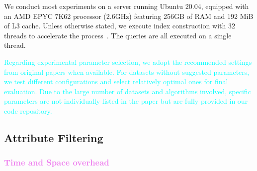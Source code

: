 \documentclass[sigconf, nonacm]{acmart}
\begin{document}
{	
	We conduct most experiments on a server running Ubuntu 20.04, equipped with an AMD EPYC 7K62 processor (2.6GHz) featuring 256GB of RAM and 192 MiB of L3 cache.  
	Unless otherwise stated, we execute index construction with 32 threads to accelerate the process~\cite{benchmarkindex}. The queries are all executed on a single thread. 
	
	\textcolor{cyan}{
	Regarding experimental parameter selection, we adopt the recommended settings from original papers when available. For datasets without suggested parameters, we test different configurations and select relatively optimal ones for final evaluation. Due to the large number of datasets and algorithms involved, specific parameters are not individually listed in the paper but are fully provided in our code repository.
}
	
	
	\subsection{Attribute Filtering}
	
	
	\subsubsection{\textcolor{violet}{Time and Space overhead}}
	\begin{figure}[t]
		\centering
		

\end{figure}}
\end{document}
